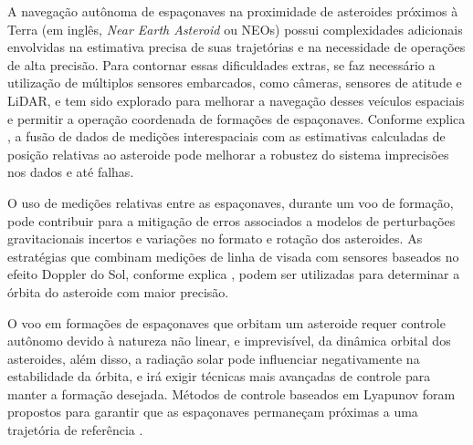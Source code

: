 A navegação autônoma de espaçonaves na proximidade de asteroides próximos à Terra (em inglês, \textit{Near Earth Asteroid} ou NEOs) possui complexidades adicionais envolvidas na estimativa precisa de suas trajetórias e na necessidade de operações de alta precisão. Para contornar essas dificuldades extras, se faz necessário a utilização de múltiplos sensores embarcados, como câmeras, sensores de atitude e LiDAR, e tem sido explorado para melhorar a navegação desses veículos espaciais e permitir a operação coordenada de formações de espaçonaves. Conforme explica \citep{vetrisano2015autonomous}, a fusão de dados de medições interespaciais com as estimativas calculadas de posição relativas ao asteroide pode melhorar a robustez do sistema imprecisões nos dados e até falhas.

O uso de medições relativas entre as espaçonaves, durante um voo de formação, pode contribuir para a mitigação de erros associados a modelos de perturbações gravitacionais incertos e variações no formato e rotação dos asteroides. As estratégias que combinam medições de linha de visada com sensores baseados no efeito Doppler do Sol, conforme explica \citep{yim2000autonomous}, podem ser utilizadas para determinar a órbita do asteroide com maior precisão.

O voo em formações de espaçonaves que orbitam um asteroide requer controle autônomo devido à natureza não linear, e imprevisível, da dinâmica orbital dos asteroides, além disso, a radiação solar pode influenciar negativamente na estabilidade da órbita, e irá exigir técnicas mais avançadas de controle para manter a formação desejada. Métodos de controle baseados em Lyapunov foram propostos para garantir que as espaçonaves permaneçam próximas a uma trajetória de referência \citep{vetrisano2015autonomous}.


